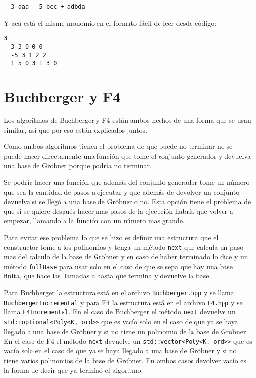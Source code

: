 \documentclass{report}
\theoremstyle{customstyle}
\theoremstyle{factstyle}
\begin{document}
\begin{lstlisting}
  3 aaa - 5 bcc + adbda
\end{lstlisting}

Y acá está el mismo monomio en el formato fácil de leer desde código:

\begin{lstlisting}[escapechar=+]
  3
  3 3 0 0 0
  -5 3 1 2 2
  1 5 0 3 1 3 0
\end{lstlisting}

\section{Buchberger y F4}

Los algoritmos de Buchberger y F4 están ambos hechos de una forma que se usan similar, así que por eso están explicados juntos.

Como ambos algoritmos tienen el problema de que puede no terminar no se puede hacer directamente una función que tome el conjunto generador y devuelva una base de Gröbner porque podría no terminar.

Se podría hacer una función que además del conjunto generador tome un número que sea la cantidad de pasos a ejecutar y que además de devolver un conjunto devuelva si se llegó a una base de Gröbner o no. Esta opción tiene el problema de que si se quiere después hacer mas pasos de la ejecución habría que volver a empezar, llamando a la función con un número mas grande.

Para evitar ese problema lo que se hizo es definir una estructura que el constructor tome a los polinomios y tenga un método \texttt{next} que calcula un paso mas del calculo de la base de Gröbner y en caso de haber terminado lo dice y un método \texttt{fullBase} para usar solo en el caso de que se sepa que hay una base finita, que hace las llamadas a  hasta que termina y devuelve la base.

Para Buchberger la estructura está en el archivo \texttt{Buchberger.hpp} y se llama \texttt{BuchbergerIncremental} y para F4 la estructura está en el archivo \texttt{F4.hpp} y se llama \texttt{F4Incremental}. En el caso de Buchberger el método \texttt{next} devuelve un \texttt{std::optional<Poly<K, ord>>} que es vacío solo en el caso de que ya se haya llegado a una base de Gröbner y si no tiene un polinomio de la base de Gröbner. En el caso de F4 el método \texttt{next} devuelve un \texttt{std::vector<Poly<K, ord>>} que es vacío solo en el caso de que ya se haya llegado a una base de Gröbner y si no tiene varios polinomios de la base de Gröbner. En ambos casos devolver vacío es la forma de decir que ya terminó el algoritmo.
\end{document}

